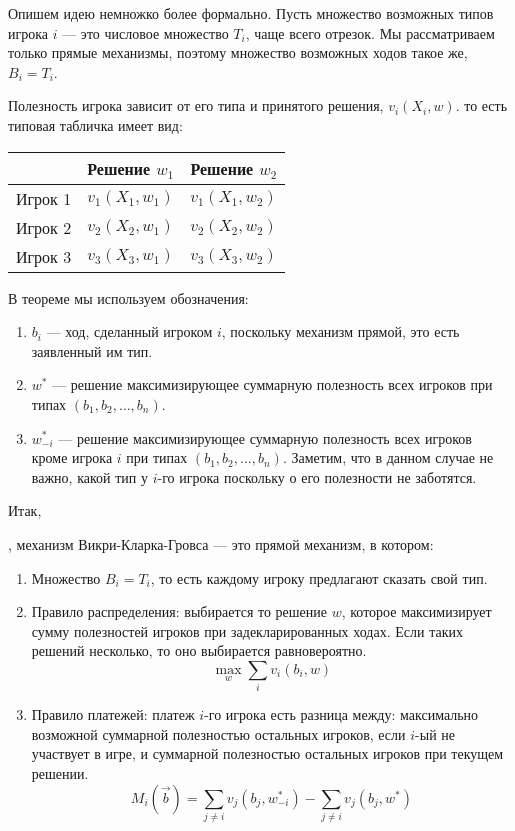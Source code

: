 Опишем идею немножко более формально. Пусть множество возможных типов игрока $ i $ — это числовое множество $ T_{i} $, чаще всего отрезок. Мы рассматриваем только прямые механизмы, поэтому множество возможных ходов такое же, $ B_{i}=T_{i}$.

Полезность игрока зависит от его типа и принятого решения, $ v_{i}(X_{i},w) $. то есть типовая табличка имеет вид:

\begin{tabular}{c|cc}
& Решение $ w_{1} $ & Решение $ w_{2} $ \\
\hline
Игрок 1 & $v_{1}(X_{1},w_{1})$ & $v_{1}(X_{1},w_{2})$ \\
Игрок 2 & $v_{2}(X_{2},w_{1})$ & $v_{2}(X_{2},w_{2})$ \\
Игрок 3 & $v_{3}(X_{3},w_{1})$ & $v_{3}(X_{3},w_{2})$ \\
\end{tabular}


В теореме мы используем обозначения:

\begin{enumerate}
\item $b_{i}$ — ход, сделанный игроком $ i $, поскольку механизм прямой, это есть заявленный им тип.
\item $w^{*}$ — решение максимизирующее суммарную полезность всех игроков при типах $ (b_{1},b_{2},\ldots,b_{n}) $.
\item $w_{-i}^{*} $ — решение максимизирующее суммарную полезность всех игроков кроме игрока $ i $ при типах $ (b_{1},b_{2},\ldots,b_{n}) $. Заметим, что в данном случае не важно, какой тип у $ i $-го игрока поскольку о его полезности не заботятся.
\end{enumerate}

Итак,
\begin{mydef} , механизм Викри-Кларка-Гровса — это прямой механизм, в котором:
\begin{enumerate}
\item Множество $ B_{i}=T_{i} $, то есть каждому игроку предлагают сказать свой тип.
\item Правило распределения: выбирается то решение $ w $, которое максимизирует сумму полезностей игроков при задекларированных ходах. Если таких решений несколько, то оно выбирается равновероятно.
\begin{equation}
\max_{w} \sum_{i} v_{i}(b_{i},w)
\end{equation}
\item Правило платежей: платеж $ i $-го игрока есть разница между: максимально возможной суммарной полезностью остальных игроков, если $ i $-ый не участвует в игре, и суммарной полезностью остальных игроков при текущем решении.
\begin{equation}
M_{i}(\vec{b})=\sum_{j\neq i} v_{j}(b_{j},w_{-i}^{*})-\sum_{j\neq i} v_{j}(b_{j},w^{*})
\end{equation}
\end{enumerate}
\end{mydef}

